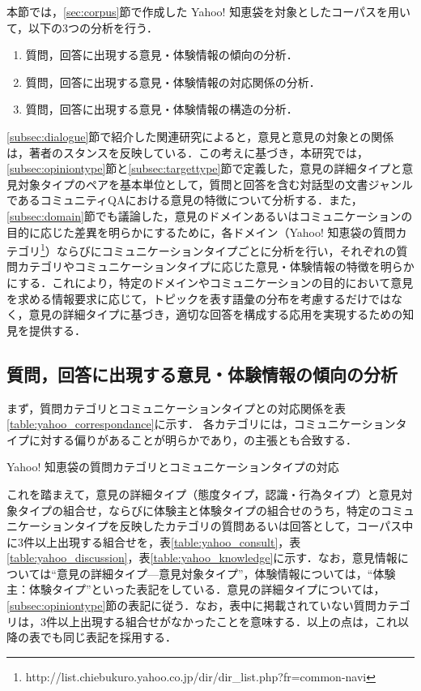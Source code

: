 \documentclass[japanese]{jnlp_1.4}
\begin{document}
本節では，\ref{sec:corpus}節で作成した Yahoo! 知恵袋を対象としたコーパスを用いて，以下の3つの分析を行う．

\begin{enumerate}
\item 質問，回答に出現する意見・体験情報の傾向の分析．
\item 質問，回答に出現する意見・体験情報の対応関係の分析．
\item 質問，回答に出現する意見・体験情報の構造の分析．
\end{enumerate}
\ref{subsec:dialogue}節で紹介した関連研究によると，意見と意見の対象との関係は，著者のスタンスを反映している．この考えに基づき，本研究では，\ref{subsec:opiniontype}節と\ref{subsec:targettype}節で定義した，意見の詳細タイプと意見対象タイプのペアを基本単位として，質問と回答を含む対話型の文書ジャンルであるコミュニティQAにおける意見の特徴について分析する．また，\ref{subsec:domain}節でも議論した，意見のドメインあるいはコミュニケーションの目的に応じた差異を明らかにするために，各ドメイン（Yahoo! 知恵袋の質問カテゴリ\footnote{http://list.chiebukuro.yahoo.co.jp/dir/dir\_list.php?fr=common-navi}）ならびにコミュニケーションタイプ\cite{adamic2008www,kabutoya2008dbsj}ごとに分析を行い，それぞれの質問カテゴリやコミュニケーションタイプに応じた意見・体験情報の特徴を明らかにする．これにより，特定のドメインやコミュニケーションの目的において意見を求める情報要求に応じて，トピックを表す語彙の分布を考慮するだけではなく，意見の詳細タイプに基づき，適切な回答を構成する応用を実現するための知見を提供する．


\subsection{質問，回答に出現する意見・体験情報の傾向の分析}
\label{subsec:analysis1}

まず，質問カテゴリとコミュニケーションタイプとの対応関係を表\ref{table:yahoo_correspondance}に示す．
各カテゴリには，コミュニケーションタイプに対する偏りがあることが明らかであり，の主張とも合致する．

\begin{table}[p]
\caption{Yahoo! 知恵袋の質問カテゴリとコミュニケーションタイプの対応}
\label{table:yahoo_correspondance}

\end{table}

これを踏まえて，意見の詳細タイプ（態度タイプ，認識・行為タイプ）と意見対象タイプの組合せ，ならびに体験主と体験タイプの組合せのうち，特定のコミュニケーションタイプを反映したカテゴリの質問あるいは回答として，コーパス中に3件以上出現する組合せを，表\ref{table:yahoo_consult}，表\ref{table:yahoo_discussion}，表\ref{table:yahoo_knowledge}に示す．なお，意見情報については``意見の詳細タイプ—意見対象タイプ''，体験情報については，``体験主：体験タイプ''といった表記をしている．意見の詳細タイプについては，\ref{subsec:opiniontype}節の表記に従う．なお，表中に掲載されていない質問カテゴリは，3件以上出現する組合せがなかったことを意味する．以上の点は，これ以降の表でも同じ表記を採用する．
\end{document}

